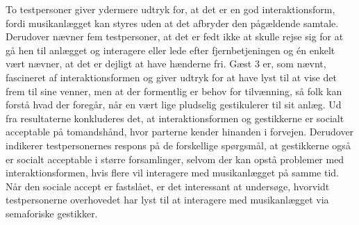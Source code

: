 To testpersoner giver ydermere udtryk for, at det er en god interaktionsform, fordi musikanlægget kan styres uden at det afbryder den pågældende samtale. Derudover nævner fem testpersoner, at det er fedt ikke at skulle rejse sig for at gå hen til anlægget og interagere eller lede efter fjernbetjeningen og én enkelt vært nævner, at det er dejligt at have hænderne fri. Gæst 3 er, som nævnt, fascineret af interaktionsformen og giver udtryk for at have lyst til at vise det frem til sine venner, men at der formentlig er behov for tilvænning, så folk kan forstå hvad der foregår, når en vært lige pludselig gestikulerer til sit anlæg. \blankline
%
Ud fra resultaterne konkluderes det, at interaktionsformen og gestikkerne er socialt acceptable på tomandshånd, hvor parterne kender hinanden i forvejen. Derudover indikerer testpersonernes respons på de forskellige spørgsmål, at gestikkerne også er socialt acceptable i større forsamlinger, selvom der kan opstå problemer med interaktionsformen, hvis flere vil interagere med musikanlægget på samme tid. Når den sociale accept er fastslået, er det interessant at undersøge, hvorvidt testpersonerne overhovedet har lyst til at interagere med musikanlægget via semaforiske gestikker. 

